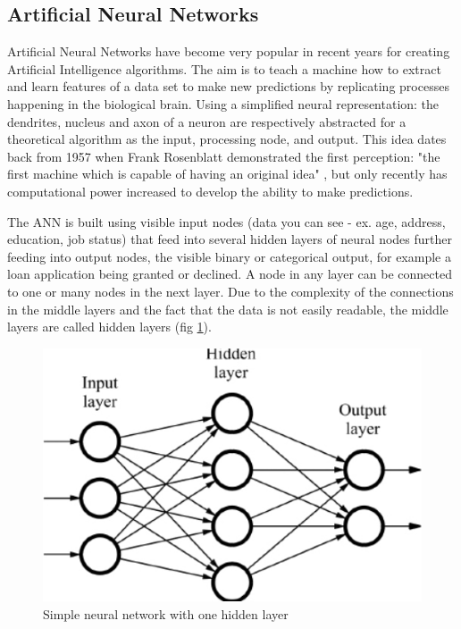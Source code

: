 \documentclass[proposal]{softeng}
\begin{document}
\subsection{Artificial Neural Networks}

Artificial Neural Networks have become very popular in recent years for creating Artificial Intelligence algorithms. The aim is to teach a machine how to extract and learn features of a data set to make new predictions by replicating processes happening in the biological brain. Using a simplified neural representation: the dendrites, nucleus and axon of a neuron are respectively abstracted for a theoretical algorithm as the input, processing node, and output. This idea dates back from 1957 when Frank Rosenblatt demonstrated the first perception: "the first machine which is capable of having an original idea" \cite{rosenblatt}, but only recently has computational  power increased to develop the ability to make predictions.

The ANN is built using visible input nodes (data you can see - ex. age, address, education, job status) that feed into several hidden layers of neural nodes further feeding into output nodes, the visible binary or categorical output, for example a loan application being granted or declined. A node in any layer can be connected to one or many  nodes in the next layer. Due to the complexity of the connections in the middle layers and the fact that the data is not easily readable, the middle layers are called hidden layers (fig \ref{fig:simplenetwork}).

\begin{figure}[h!]
\centering
  \includegraphics[scale=0.4]{images/simple-neural-network.jpg}
  \caption{Simple neural network with one hidden layer \cite{simpleneural}}
  \label{fig:simplenetwork}
\end{figure}
\end{document}
